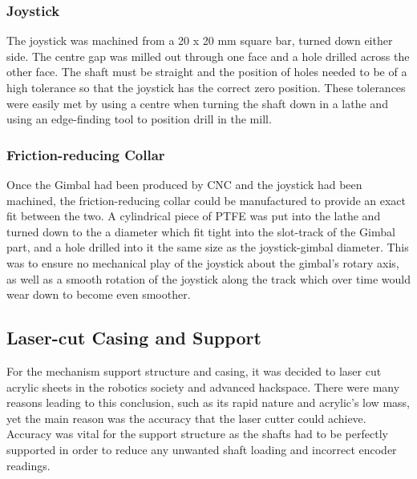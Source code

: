 
\subsubsection{Joystick} %
\label{par:joystick}

The joystick was machined from a 20 x 20 mm square bar, turned down either side. The centre gap was milled out through one face and a hole drilled across the other face. The shaft must be straight and the position of holes needed to be of a high tolerance so that the joystick has the correct zero position. These tolerances were easily met by using a centre when turning the shaft down in  a lathe and using an edge-finding tool to position drill in the mill.


\subsubsection{Friction-reducing Collar} %
\label{par:friction_reducing_collar}

Once the Gimbal had been produced by CNC and the joystick had been machined, the friction-reducing collar could be manufactured to provide an exact fit between the two. A cylindrical piece of PTFE was put into the lathe and turned down to the a diameter which fit tight into the slot-track of the Gimbal part, and a hole drilled into it the same size as the joystick-gimbal diameter. This was to ensure no mechanical play of the joystick about the gimbal’s rotary axis, as well as a smooth rotation of the joystick along the track which over time would wear down to become even smoother.



\subsection{Laser-cut Casing and Support} %
\label{sub:laser_cut_casing_and_support}

For the mechanism support structure and casing, it was decided to laser cut acrylic sheets in the robotics society and advanced hackspace. There were many reasons leading to this conclusion, such as its rapid nature and acrylic’s low mass, yet the main reason was the accuracy that the laser cutter could achieve. Accuracy was vital for the support structure as the shafts had to be perfectly supported in order to reduce any unwanted shaft loading and incorrect encoder readings.

